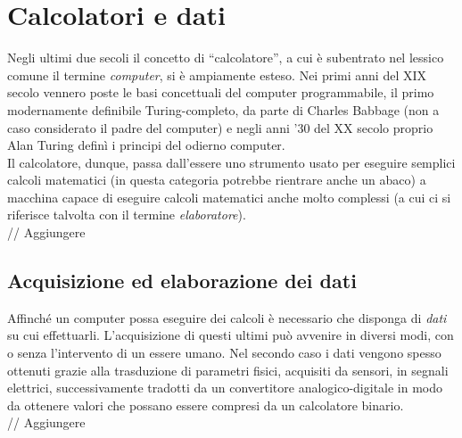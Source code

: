
\chapter{Calcolatori e dati} %

\label{Chapter2} %


Negli ultimi due secoli il concetto di ``calcolatore'', a cui è subentrato nel
lessico comune il termine \emph{computer}, si è ampiamente esteso. Nei primi
anni del XIX secolo vennero poste le basi concettuali del computer programmabile, 
il primo modernamente definibile Turing-completo, da parte di Charles Babbage 
(non a caso considerato il padre del computer\citep{CBabbage})
e negli anni '30 del XX secolo proprio Alan Turing definì i principi del odierno computer. 
\\
Il calcolatore, dunque, passa dall'essere uno strumento usato per
eseguire semplici calcoli matematici (in questa categoria potrebbe rientrare
anche un abaco) a macchina capace di eseguire calcoli matematici anche molto 
complessi (a cui ci si riferisce talvolta con il termine \emph{elaboratore}).
\\
// Aggiungere


\section{Acquisizione ed elaborazione dei dati}

Affinché un computer possa eseguire dei calcoli è necessario che disponga di
\emph{dati} su cui effettuarli. L'acquisizione di questi ultimi può avvenire
in diversi modi, con o senza l'intervento di un essere umano.
Nel secondo caso i dati vengono spesso ottenuti grazie alla trasduzione 
di parametri fisici, acquisiti da sensori, in segnali elettrici, successivamente
tradotti da un convertitore analogico-digitale in modo da ottenere valori che 
possano essere compresi da un calcolatore binario.
\\
// Aggiungere
